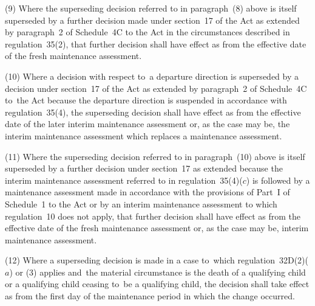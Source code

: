 \documentclass[12pt,a4paper]{article}
\begin{document}
(9) Where the superseding decision referred to in paragraph~(8) above is itself superseded by a further decision made under section~17 of the Act as extended by paragraph~2 of Schedule~4C to the Act in the circumstances described in regulation~35(2), that further decision shall have effect as from the effective date of the fresh maintenance assessment.

(10) Where a decision with respect to~a departure direction is superseded by a decision under section~17 of the Act as extended by paragraph~2 of Schedule~4C to~the Act because the departure direction is suspended in accordance with regulation~35(4), the superseding decision shall have effect as from the effective date of the later interim maintenance assessment or, as the case may be, the interim maintenance assessment which replaces a maintenance assessment.

(11) Where the superseding decision referred to in paragraph~(10) above is itself superseded by a further decision under section~17 as extended because the interim maintenance assessment referred to in regulation~35(4)($c$) is followed by a maintenance assessment made in accordance with the provisions of Part~I of Schedule~1 to the Act or by an interim maintenance assessment to which regulation~10 does not apply, that further decision shall have effect as from the effective date of the fresh maintenance assessment or, as the case may be, interim maintenance assessment.%

(12) Where a superseding decision is made in a case to~which regulation~32D(2)($a$)  or (3) applies and~the material circumstance is the death of a qualifying child or a qualifying child ceasing to~be a qualifying child, the decision shall take effect as from the first day of the maintenance period in which the change occurred.

\end{document}
